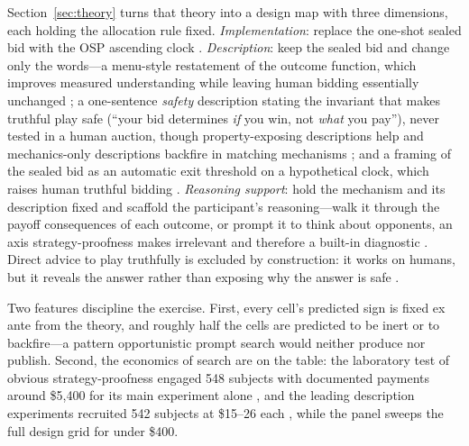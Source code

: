Section~\ref{sec:theory} turns that theory into a design map with three dimensions, each holding the allocation rule fixed. \emph{Implementation}: replace the one-shot sealed bid with the OSP ascending clock \citep{li2017obviously, pycia2023theory}. \emph{Description}: keep the sealed bid and change only the words---a menu-style restatement of the outcome function, which improves measured understanding while leaving human bidding essentially unchanged \citep{gonczarowski2023strategyproofness, gonczarowski2024describing}; a one-sentence \emph{safety} description stating the invariant that makes truthful play safe (``your bid determines \emph{if} you win, not \emph{what} you pay''), never tested in a human auction, though property-exposing descriptions help and mechanics-only descriptions backfire in matching mechanisms \citep{katuscak2024simpler, guillen2018effectiveness}; and a framing of the sealed bid as an automatic exit threshold on a hypothetical clock, which raises human truthful bidding \citep{breitmoser2022obviousness}. \emph{Reasoning support}: hold the mechanism and its description fixed and scaffold the participant's reasoning---walk it through the payoff consequences of each outcome, or prompt it to think about opponents, an axis strategy-proofness makes irrelevant and therefore a built-in diagnostic \citep{li2024designing, borgers2019strategically}. Direct advice to play truthfully is excluded by construction: it works on humans, but it reveals the answer rather than exposing why the answer is safe \citep{masuda2022net}.

Two features discipline the exercise. First, every cell's predicted sign is fixed ex ante from the theory, and roughly half the cells are predicted to be inert or to backfire---a pattern opportunistic prompt search would neither produce nor publish. Second, the economics of search are on the table: the laboratory test of obvious strategy-proofness engaged 548 subjects with documented payments around \$5{,}400 for its main experiment alone \citep{li2017obviously}, and the leading description experiments recruited 542 subjects at \$15--26 each \citep{gonczarowski2024describing}, while the panel sweeps the full design grid for under \$400.

